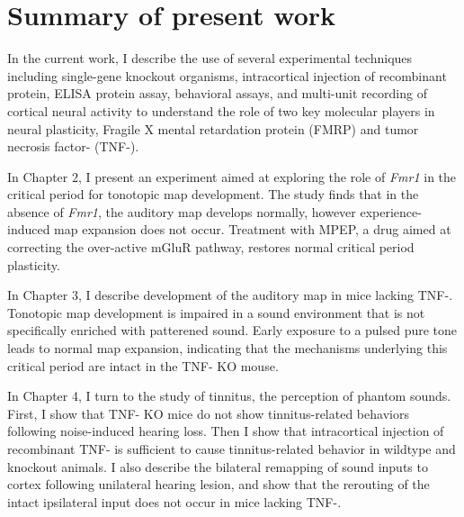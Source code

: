 \section{Summary of present work}

In the current work, I describe the use of several experimental techniques including single-gene knockout organisms, intracortical injection of recombinant protein, ELISA protein assay, behavioral assays, and multi-unit recording of cortical neural activity to understand the role of two key molecular players in neural plasticity, Fragile X mental retardation protein (FMRP) and tumor necrosis factor-\textalpha{} (TNF-\textalpha{}).

In Chapter 2, I present an experiment aimed at exploring the role of \textit{Fmr1} in the critical period for tonotopic map development. The study finds that in the absence of \textit{Fmr1}, the auditory map develops normally, however experience-induced map expansion does not occur. Treatment with MPEP, a drug aimed at correcting the over-active mGluR pathway, restores normal critical period plasticity.

In Chapter 3, I describe development of the auditory map in mice lacking TNF-\textalpha{}. Tonotopic map development is impaired in a sound environment that is not specifically enriched with patterened sound. Early exposure to a pulsed pure tone leads to normal map expansion, indicating that the mechanisms underlying this critical period are intact in the TNF-\textalpha{} KO mouse.

In Chapter 4, I turn to the study of tinnitus, the perception of phantom sounds. First, I show that TNF-\textalpha{} KO mice do not show tinnitus-related behaviors following noise-induced hearing loss. Then I show that intracortical injection of recombinant TNF-\textalpha{} is sufficient to cause tinnitus-related behavior in wildtype and knockout animals. I also describe the bilateral remapping of sound inputs to cortex following unilateral hearing lesion, and show that the rerouting of the intact ipsilateral input does not occur in mice lacking TNF-\textalpha{}.